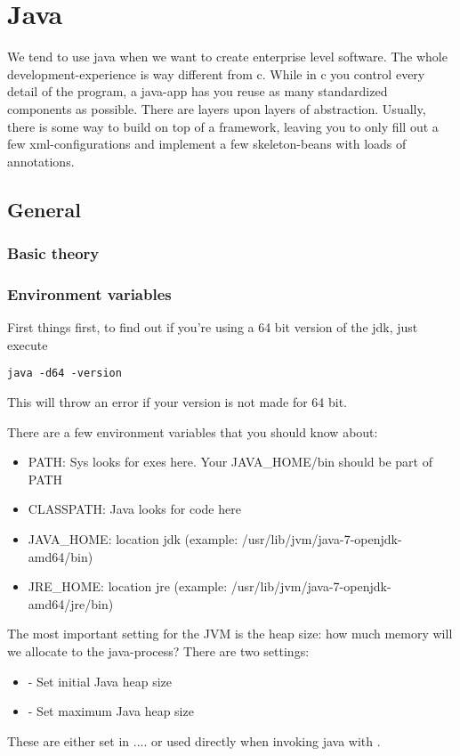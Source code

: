 \section{Java}

We tend to use java when we want to create enterprise level software. The whole development-experience is way different from c. While in c you control every detail of the program, a java-app has you reuse as many standardized components as possible. There are layers upon layers of abstraction. Usually, there is some way to build on top of a framework, leaving you to only fill out a few xml-configurations and implement a few skeleton-beans with loads of annotations.


\subsection{General}

\subsubsection{Basic theory}

\subsubsection{Environment variables} 

First things first, to find out if you're using a 64 bit version of the jdk, just execute
\begin{lstlisting}
java -d64 -version
\end{lstlisting}
This will throw an error if your version is not made for 64 bit. 

There are a few environment variables that you should know about: 
\begin{itemize}
    \item PATH: Sys looks for exes here. Your JAVA\_HOME/bin should be part of PATH
    \item CLASSPATH: Java looks for code here
    \item JAVA\_HOME: location jdk (example: /usr/lib/jvm/java-7-openjdk-amd64/bin)
    \item JRE\_HOME: location jre (example: /usr/lib/jvm/java-7-openjdk-amd64/jre/bin)
\end{itemize}

The most important setting for the JVM is the heap size: how much memory will we allocate to the java-process? There are two settings: 
\begin{itemize}
    \item {} - Set initial Java heap size
    \item {} - Set maximum Java heap size
\end{itemize}
These are either set in .... or used directly when invoking java with .

